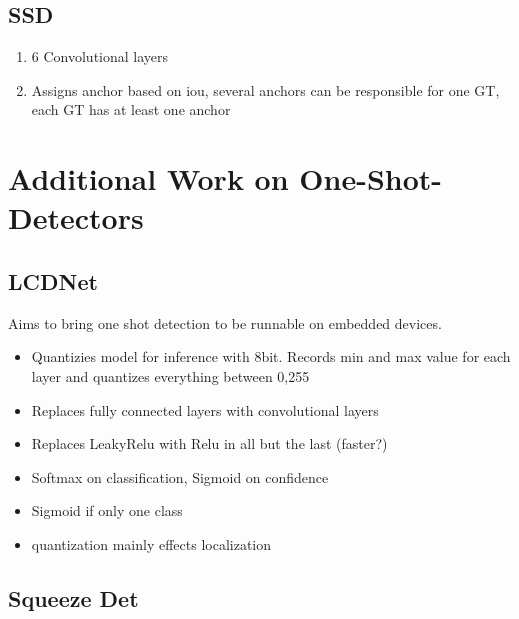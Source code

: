 \documentclass{article}
\begin{document}
\subsection{SSD}
\begin{enumerate}
	\item 6 Convolutional layers
	\item Assigns anchor based on iou, several anchors can be responsible for one GT, each GT has at least one anchor
\end{enumerate}

\section{Additional Work on One-Shot-Detectors}

\subsection{LCDNet\cite{TripathiSanDiego}}

Aims to bring one shot detection to be runnable on embedded devices.

\begin{itemize}
	\item Quantizies model for inference with 8bit. Records min and max value for each layer and quantizes everything between 0,255
	\item Replaces fully connected layers with convolutional layers
	\item Replaces LeakyRelu with Relu in all but the last (faster?)
	\item Softmax on classification, Sigmoid on confidence
	\item Sigmoid if only one class
	\item quantization mainly effects localization
\end{itemize}

\subsection{Squeeze Det \cite{Wu}}






\end{document}
